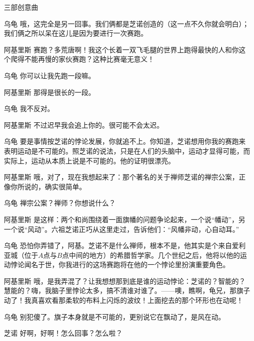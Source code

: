 \begin{dialog}{三部创意曲}
\begin{dialogue}
\item[乌龟]哦，这完全是另一回事。我们俩都是芝诺创造的（这一点不久你就会明白）；我们俩之所以呆在这儿是因为要进行一次赛跑。

\item[阿基里斯]赛跑？多荒唐啊！我这个长着一双飞毛腿的世界上跑得最快的人和你这个爬得不能再慢的家伙赛跑？这种比赛毫无意义！

\item[乌龟]你可以让我先跑一段嘛。

\item[阿基里斯]那得是很长的一段。

\item[乌龟]我不反对。

\item[阿基里斯]不过迟早我会追上你的。很可能不会太迟。

\item[乌龟]要是事情按芝诺的悖论发展，你就追不上。你知道，芝诺想用你我的赛跑来表明运动是不可能的。照芝诺的说法，只是在人们的头脑中，运动才显得可能，而实际上，运动从本质上说是不可能的。他的证明很漂亮。

\item[阿基里斯]哦，对了，现在我想起来了：那个著名的关于禅师芝诺的禅宗公案，正像你所说的，确实很简单。

\item[乌龟]禅宗公案？禅师？你想说什么？

\item[阿基里斯]是这样：两个和尚围绕着一面旗幡的问题争论起来，一个说“幡动”，另一个说“风动”。六祖芝诺正巧从这里走过，告诉他们：“风幡非动，心自动耳。”

\item[乌龟]恐怕你弄错了，阿基。芝诺不是什么禅师，根本不是，他其实是个来自爱利亚城（位于$A$点与$B$点中间的地方）的希腊哲学家。几个世纪之后，他将以他的运动悖论闻名于世，你我进行的这场赛跑将在他的一个悖论里扮演重要角色。

\item[阿基里斯]哦，是我弄混了？让我想想那到底是谁的运动悖论：芝诺的？智能的？慧能的？嗨，我脑子里悖论太多，搞不清谁对谁了。——噢，瞧啊，龟兄，那旗子动了！我真喜欢看那柔软的布料上闪烁的波纹！上面挖去的那个环形也在动呢！

\item[乌龟]别犯傻了。旗子本身就是不可能的，更别说它在飘动了，是风在动。


\item[芝诺]好啊，好啊！怎么回事？怎么啦？


\end{dialogue}
\end{dialog}
